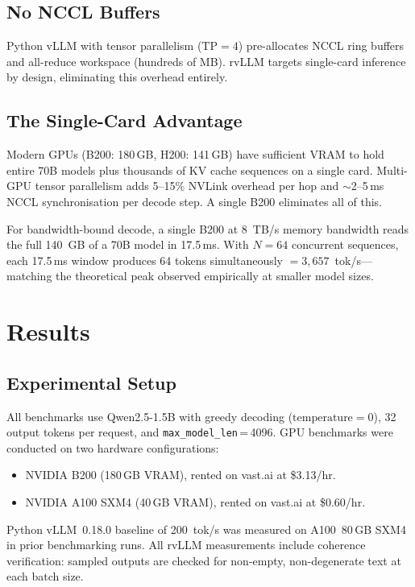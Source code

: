 \documentclass[11pt,a4paper]{article}
\begin{document}
\subsection{No NCCL Buffers}

Python vLLM with tensor parallelism ($\text{TP}\!=\!4$) pre-allocates NCCL ring
buffers and all-reduce workspace (hundreds of MB). rvLLM targets single-card
inference by design, eliminating this overhead entirely.

\subsection{The Single-Card Advantage}

Modern GPUs (B200: 180\,GB, H200: 141\,GB) have sufficient VRAM to hold entire
70B models plus thousands of KV cache sequences on a single card. Multi-GPU tensor
parallelism adds 5--15\% NVLink overhead per hop and $\sim$2--5\,ms NCCL
synchronisation per decode step. A single B200 eliminates all of this.

For bandwidth-bound decode, a single B200 at 8~TB/s memory bandwidth reads the
full 140~GB of a 70B model in 17.5\,ms. With $N\!=\!64$ concurrent sequences,
each 17.5\,ms window produces 64 tokens simultaneously $= 3{,}657$~tok/s---matching
the theoretical peak observed empirically at smaller model sizes.

\section{Results}
\label{sec:results}

\subsection{Experimental Setup}

All benchmarks use Qwen2.5-1.5B with greedy decoding ($\text{temperature}\!=\!0$),
32 output tokens per request, and \texttt{max\_model\_len}\,=\,4096. GPU benchmarks
were conducted on two hardware configurations:
\begin{itemize}
  \item NVIDIA B200 (180\,GB VRAM), rented on vast.ai at \$3.13/hr.
  \item NVIDIA A100 SXM4 (40\,GB VRAM), rented on vast.ai at \$0.60/hr.
\end{itemize}
Python vLLM~0.18.0 baseline of 200~tok/s was measured on A100~80\,GB SXM4 in
prior benchmarking runs. All rvLLM measurements include coherence verification:
sampled outputs are checked for non-empty, non-degenerate text at each batch size.
\end{document}
